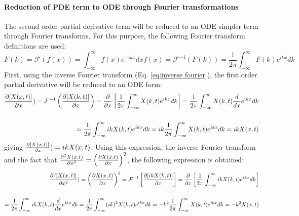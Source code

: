 \paragraph{Reduction of PDE term to ODE through Fourier transformations}
The second order partial derivative term will be reduced to an ODE simpler term through Fourier transforms. For this purpose, the following Fourier transform definitions are used:
\begin{subequations}
    \begin{equation}
        F(k) = \mathcal{F}(f(x)) = \int_{-\infty}^{\infty} f(x)e^{-ikx} dx
    \end{equation}
    \begin{equation}
        f(x) = \mathcal{F}^{-1}(F(k)) = \frac{1}{2\pi}\int_{-\infty}^{\infty} F(k)e^{ikx} dk
        \label{eq:inverse fourier}
    \end{equation}
\end{subequations}
First, using the inverse Fourier transform (Eq. \eqref{eq:inverse fourier}), the first order partial derivative will be reduced to an ODE form:
\begin{equation}
    \begin{split}
        \pdv{[X(x,t)]}{x}) = \mathcal{F}^{-1}\left(\pdv{[X(k,t)]}{x}\right) = \frac{\partial}{\partial x}\left[\frac{1}{2\pi}\int_{-\infty}^{\infty} X(k,t)e^{ikx} dk\right] =  \frac{1}{2\pi}\int_{-\infty}^{\infty} X(k,t)\frac{d}{dx}e^{ikx} dk\\\\ =\frac{1}{2\pi}\int_{-\infty}^{\infty} ik X(k,t)e^{ikx} dk = ik \frac{1}{2\pi}\int_{-\infty}^{\infty} X(k,t)e^{ikx} dk = ik X(x,t)
    \end{split}
\end{equation}
giving $\pdv{[X(x,t)]}{x}) =  ik X(x,t)$.
Using this expression, the inverse Fourier transform and the fact that $\frac{\partial^{2} {X(x,t)}}{\partial {x}^{2}} =\left(\pdv{X(x,t)}{x}\right)^2$, the following expression is obtained:
\begin{equation}
    \begin{split}
        \frac{\partial^{2} {[X(x,t)]}}{\partial {x}^{2}}) = \left(\pdv{X(x,t)}{x}\right)^2 = \mathcal{F}^{-1}\left[\pdv{[ikX(k,t)]}{x}\right] = \frac{\partial}{\partial x}\left[\frac{1}{2\pi}\int_{-\infty}^{\infty} ikX(k,t)e^{ikx} dk\right] \\\\=  \frac{1}{2\pi}\int_{-\infty}^{\infty} ikX(k,t)\frac{d}{dx}e^{ikx} dk =\frac{1}{2\pi}\int_{-\infty}^{\infty} (ik)^2 X(k,t)e^{ikx} dk = -k^2 \frac{1}{2\pi}\int_{-\infty}^{\infty} X(k,t)e^{ikx} dk = -k^2 X(x,t)
    \end{split}
    \label{eq:fourier of our system}
\end{equation}
